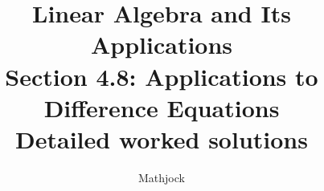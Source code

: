 
\title{\textbf{Linear Algebra and Its Applications}\\[0.3em]Section 4.8: Applications to Difference Equations\\[0.3em]\large Detailed worked solutions}
\author{Mathjock}
\date{}

\maketitle
\bookinfo
\tableofcontents
\clearpage
\renewcommand{\thesection}{4.\arabic{section}}
\renewcommand{\theHsection}{4.\arabic{section}}
\setcounter{section}{7}


